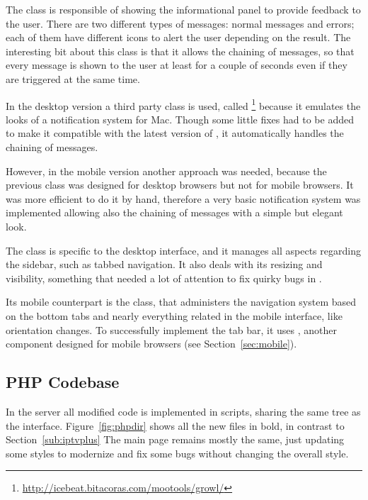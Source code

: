 The  class is responsible of showing the informational panel to provide feedback to the user.
There are two different types of messages: normal messages and errors; each of them have different icons to alert the user depending on the result.
The interesting bit about this class is that it allows the chaining of messages, so that every message is shown to the user at least for a couple of seconds even if they are triggered at the same time.

In the desktop version a third party  class is used, called \footnote{\url{http://icebeat.bitacoras.com/mootools/growl/}} because it emulates the looks of a notification system for Mac.
Though some little fixes had to be added to make it compatible with the latest version of , it automatically handles the chaining of messages.

However, in the mobile version another approach was needed, because the previous class was designed for desktop browsers but not for mobile browsers.
It was more efficient to do it by hand, therefore a very basic notification system was implemented allowing also the chaining of messages with a simple but elegant look.

The  class is specific to the desktop interface, and it manages all aspects regarding the sidebar, such as tabbed navigation.
It also deals with its resizing and visibility, something that needed a lot of attention to fix quirky bugs in .

Its mobile counterpart is the  class, that administers the navigation system based on the bottom tabs and nearly everything related in the mobile interface, like orientation changes.
To successfully implement the tab bar, it uses , another  component designed for  mobile browsers (see Section~\ref{sec:mobile}).

\subsection{PHP Codebase} %
\label{sub:php_codebase}

In the server all modified code is implemented in  scripts, sharing the same tree as the  interface.
Figure~\ref{fig:phpdir} shows all the new files in bold, in contrast to Section~\ref{sub:iptvplus}
The main page remains mostly the same, just updating some styles to modernize and fix some bugs without changing the overall style.

